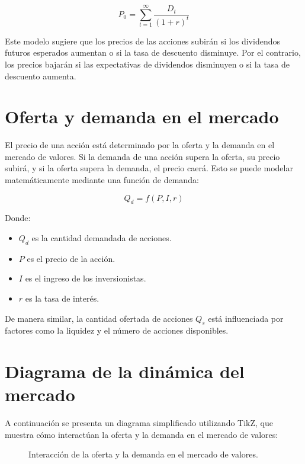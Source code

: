 \begin{equation}
P_0 = \sum_{t=1}^{\infty} \frac{D_t}{(1 + r)^t}
\end{equation}

Este modelo sugiere que los precios de las acciones subirán si los dividendos futuros esperados aumentan o si la tasa de descuento disminuye. Por el contrario, los precios bajarán si las expectativas de dividendos disminuyen o si la tasa de descuento aumenta.

\section{Oferta y demanda en el mercado}

El precio de una acción está determinado por la oferta y la demanda en el mercado de valores. Si la demanda de una acción supera la oferta, su precio subirá, y si la oferta supera la demanda, el precio caerá. Esto se puede modelar matemáticamente mediante una función de demanda:

\begin{equation}
Q_d = f(P, I, r)
\end{equation}

Donde:
\begin{itemize}
\item $Q_d$ es la cantidad demandada de acciones.
\item $P$ es el precio de la acción.
\item $I$ es el ingreso de los inversionistas.
\item $r$ es la tasa de interés.
\end{itemize}

De manera similar, la cantidad ofertada de acciones $Q_s$ está influenciada por factores como la liquidez y el número de acciones disponibles.

\section{Diagrama de la dinámica del mercado}

A continuación se presenta un diagrama simplificado utilizando TikZ, que muestra cómo interactúan la oferta y la demanda en el mercado de valores:

\begin{figure}[h!]
\centering
{}
\caption{Interacción de la oferta y la demanda en el mercado de valores.}
\end{figure}

